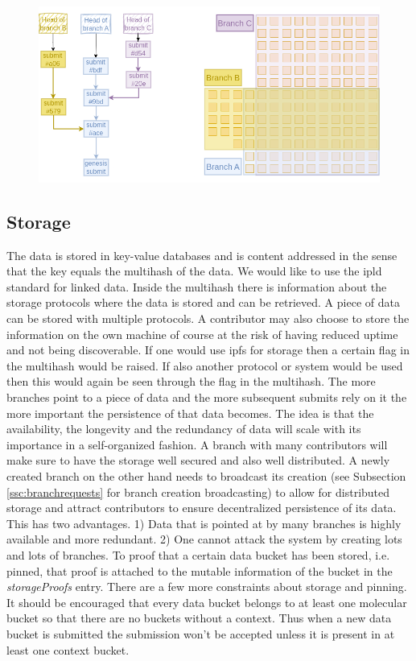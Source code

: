 \documentclass[14pt]{article}
\begin{document}
\begin{figure}[b!]
  \begin{center}
    \includegraphics[width=1.0\textwidth]{src/img/BranchBucketRelationV2.png}
\end{center}
 \caption{}
 \label{fig:branchbucketrel}
\end{figure}

\subsection{Storage}
\label{ssc:storage}

The data is stored in key-value databases and is content addressed in the sense that the key equals the multihash of the data. We would like to use the ipld standard for linked data. Inside the multihash there is information about the storage protocols where the data is stored and can be retrieved. A piece of data can be stored with multiple protocols. A contributor may also choose to store the information on the own machine of course at the risk of having reduced uptime and not being discoverable. If one would use ipfs for storage then a certain flag in the multihash would be raised. If also another protocol or system would be used then this would again be seen through the flag in the multihash. The more branches point to a piece of data and the more subsequent submits rely on it the more important the persistence of that data becomes.   
The idea is that the availability, the longevity and the redundancy of data will scale with its importance in a self-organized fashion. A branch with many contributors will make sure to have the storage well secured and also well distributed. A newly created branch on the other hand needs to broadcast its creation (see Subsection \ref{ssc:branchrequests} for branch creation broadcasting) to allow for distributed storage  and attract contributors to ensure decentralized persistence of its data. 
This has two advantages. 1) Data that is pointed at by many branches is highly available and more redundant. 2) One cannot attack the system by creating lots and lots of branches. To proof that a certain data bucket has been stored, i.e. pinned, that proof is attached to the mutable information of the bucket in the \textit{storageProofs} entry. There are a few more constraints about storage and pinning. It should be encouraged that every data bucket belongs to at least one molecular bucket so that there are no buckets without a context. Thus when a new data bucket is submitted the submission won't be accepted unless it is present in at least one context bucket.
\end{document}
